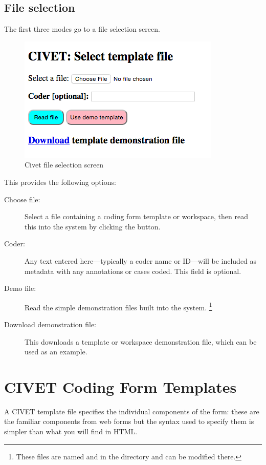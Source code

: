 \documentclass[letterpaper,10pt,english]{sphinxmanual}
\begin{document}
\section{File selection}
\label{homepage:file-selection}
The first three modes go to a file selection screen.
\begin{figure}[htbp]
\centering
\capstart

\includegraphics{fileselect.png}
\caption{Civet file selection screen}\end{figure}

This provides the following options:
\begin{description}
\item[{Choose file:}] \leavevmode
Select a file containing a coding form template or workspace, then
read this into the system by clicking the  button.

\item[{Coder:}] \leavevmode
Any text entered here—typically a coder name or ID—will be included
as metadata with any annotations or cases coded. This field is
optional.

\item[{Demo file:}] \leavevmode
Read the simple demonstration files built into the system. \footnote{
These files are named  and
 in the directory
 and can be modified
there.
}

\item[{Download demonstration file:}] \leavevmode
This downloads a template or workspace demonstration file, which can
be used as an example.

\end{description}


\chapter{CIVET Coding Form Templates}
\label{forms:sec-forms}\label{forms:civet-coding-form-templates}\label{forms::doc}
A CIVET template file specifies the individual components of the form:
these are the familiar components from web forms but the syntax used to
specify them is simpler than what you will find in HTML.
\end{document}
